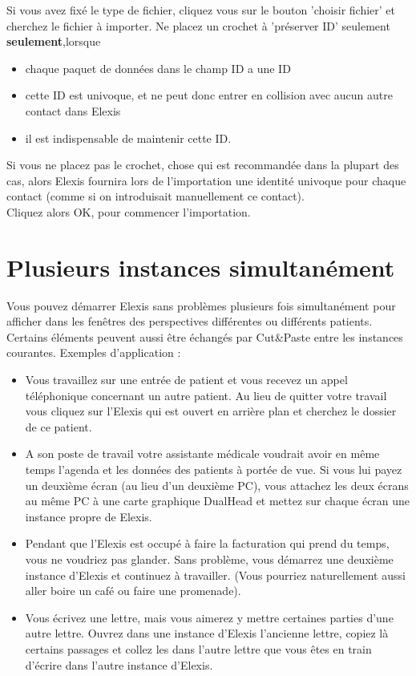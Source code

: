 \medskip

Si vous avez fixé le type de fichier, cliquez vous sur le bouton 'choisir fichier' et cherchez le fichier à importer. Ne placez un crochet à 'préserver ID' seulement 
 \textbf{seulement},lorsque \begin{itemize}
\item chaque paquet de données dans le champ ID a une ID 
\item cette ID est univoque, et ne peut donc entrer en collision avec aucun autre contact dans Elexis
\item il est indispensable de maintenir cette ID.
\end{itemize}
Si vous ne placez pas le crochet, chose qui est recommandée dans la plupart des cas, alors Elexis fournira lors de l'importation une identité univoque pour chaque contact (comme si on introduisait manuellement ce contact).\\
Cliquez alors OK, pour commencer l'importation.

 \section{Plusieurs instances simultanément}
 Vous pouvez démarrer Elexis sans problèmes plusieurs fois simultanément pour afficher dans les fenêtres des perspectives différentes ou différents patients.
Certains éléments peuvent aussi être échangés par Cut\&Paste entre les instances courantes. Exemples d'application :

 \begin{itemize}
   \item Vous travaillez sur une entrée de patient et vous recevez un appel téléphonique  concernant un autre patient. Au lieu de quitter votre travail vous cliquez sur l'Elexis qui est ouvert en arrière plan et cherchez le dossier de ce patient.
   \item A son poste de travail votre assistante médicale voudrait avoir en même temps l'agenda et les données des patients à portée de vue. Si vous lui payez un deuxième écran (au lieu d'un deuxième PC), vous attachez les deux écrans au même PC à une carte graphique DualHead et mettez sur chaque écran une instance propre de Elexis.
   \item Pendant que l'Elexis est occupé à faire la facturation qui prend du temps, vous ne voudriez pas glander. Sans problème, vous démarrez une deuxième instance d'Elexis et continuez à travailler. (Vous pourriez naturellement aussi aller boire un café ou faire une promenade).
   \item Vous écrivez une lettre, mais vous aimerez y mettre certaines parties d'une autre lettre.
Ouvrez dans une instance d'Elexis l'ancienne lettre, copiez là certains passages et collez les dans l'autre lettre que vous êtes en train d'écrire dans l'autre instance d'Elexis.

 \end{itemize}

